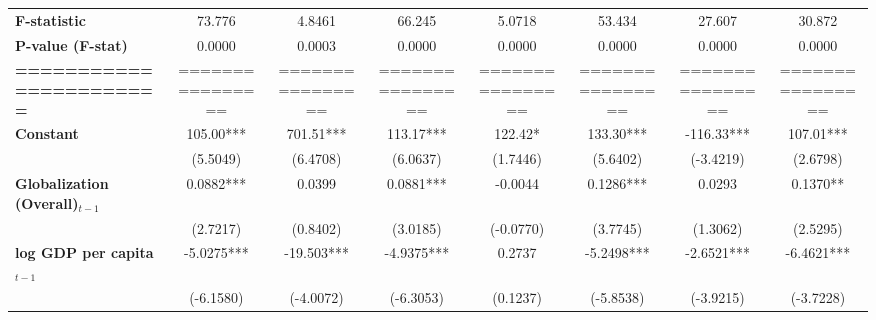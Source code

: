 \begin{center}
\begin{tabular}{lccccccc}
\textbf{F-statistic}               &        73.776        &            4.8461           &            66.245            &                5.0718               &              53.434              &            27.607           &             30.872             \\
\textbf{P-value (F-stat)}          &        0.0000        &            0.0003           &            0.0000            &                0.0000               &              0.0000              &            0.0000           &             0.0000             \\
\textbf{=======================}   &   ================   &       ================      &       ================       &           ================          &         ================         &       ================      &        ================        \\
\textbf{Constant}                     &      105.00***       &          701.51***          &          113.17***           &               122.42*               &            133.30***             &          -116.33***         &           107.01***            \\
\textbf{ }                         &       (5.5049)       &           (6.4708)          &           (6.0637)           &               (1.7446)              &             (5.6402)             &          (-3.4219)          &            (2.6798)            \\
\textbf{Globalization (Overall)$_{t-1}$}               &      0.0882***       &            0.0399           &          0.0881***           &               -0.0044               &            0.1286***             &            0.0293           &            0.1370**            \\
\textbf{ }                         &       (2.7217)       &           (0.8402)          &           (3.0185)           &              (-0.0770)              &             (3.7745)             &           (1.3062)          &            (2.5295)            \\
\textbf{log GDP per capita$_{t-1}$}           &      -5.0275***      &          -19.503***         &          -4.9375***          &                0.2737               &            -5.2498***            &          -2.6521***         &           -6.4621***           \\
\textbf{ }                         &      (-6.1580)       &          (-4.0072)          &          (-6.3053)           &               (0.1237)              &            (-5.8538)             &          (-3.9215)          &           (-3.7228)            \\

\end{tabular}
\end{center}
